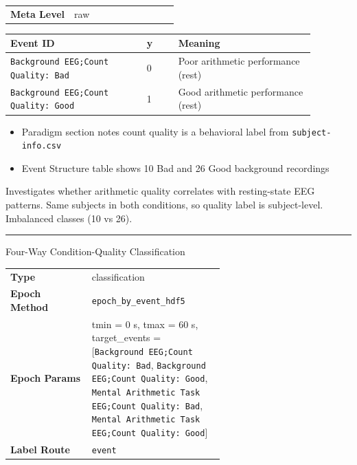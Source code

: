 {\begin{tcolorbox}
{\begin{tabular}{@{}lp{0.62\linewidth}@{}}
\textbf{Meta Level} & raw \\
\end{tabular}}
\par{}\par\smallskip
\begingroup\footnotesize
\begin{tabular}{@{}p{0.3911\linewidth}p{0.0978\linewidth}p{0.3911\linewidth}@{}}
\toprule
\textbf{Event ID} & \textbf{y} & \textbf{Meaning} \\
\midrule
\texttt{Background EEG;Count Quality: Bad} & 0 & Poor arithmetic performance (rest) \\
\texttt{Background EEG;Count Quality: Good} & 1 & Good arithmetic performance (rest) \\
\bottomrule
\end{tabular}
\endgroup
\par{}\par
\begin{itemize}[leftmargin=1.3em,noitemsep,topsep=1pt]
\item[\scriptsize$\cdot$] {\scriptsize Paradigm section notes count quality is a behavioral label from \texttt{subject-info.csv}}
\item[\scriptsize$\cdot$] {\scriptsize Event Structure table shows 10 Bad and 26 Good background recordings}
\end{itemize}
\par{} {\footnotesize Investigates whether arithmetic quality correlates with resting-state EEG patterns. Same subjects in both conditions, so quality label is subject-level. Imbalanced classes (10 vs 26).}
\noindent\rule{\linewidth}{0.7pt}\par\nopagebreak
{} {\footnotesize Four-Way Condition-Quality Classification}\par\smallskip
{\footnotesize\begin{tabular}{@{}lp{0.62\linewidth}@{}}
\textbf{Type} & classification \\
\textbf{Epoch Method} & \texttt{epoch\_by\_event\_hdf5} \\
\textbf{Epoch Params} & tmin = 0 s, tmax = 60 s, target\_events = [\texttt{Background EEG;Count Quality: Bad}, \texttt{Background EEG;Count Quality: Good}, \texttt{Mental Arithmetic Task EEG;Count Quality: Bad}, \texttt{Mental Arithmetic Task EEG;Count Quality: Good}] \\
\textbf{Label Route} & \texttt{event} \\

\end{tabular}}
\end{tcolorbox}}
